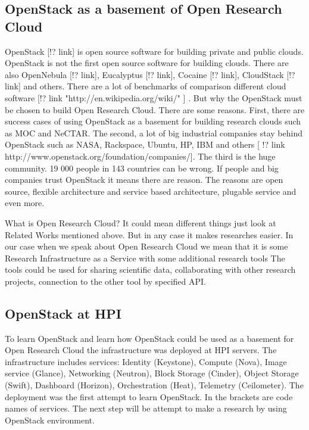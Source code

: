 \subsection{OpenStack as a basement of Open Research Cloud}
OpenStack [!? link] is open source software for building private and public clouds. OpenStack is not the first open source software for building clouds. There are also OpenNebula [!? link], Eucalyptus [!? link], Cocaine [!? link], CloudStack [!? link] and others. There are a lot of benchmarks of comparison different cloud software [!? link "http://en.wikipedia.org/wiki/" ] . But why the OpenStack must be chosen to build Open Research Cloud. There are some reasons. First, there are success cases of using OpenStack as a basement for building research clouds such as MOC and NeCTAR. The second, a lot of big industrial companies stay behind OpenStack such as NASA, Rackspace, Ubuntu, HP, IBM and others [ !? link http://www.openstack.org/foundation/companies/]. The third is the huge community. 19 000 people in 143 countries can be wrong. If people and big companies trust OpenStack it means there are reason. The reasons are open source, flexible architecture and service based architecture, plugable service and even more.  

What is Open Research Cloud? It could mean different things just look at Related Works mentioned above. But in any case it makes researches easier. In our case when we speak about Open Research Cloud we mean that it is some Research Infrastructure as a Service with some additional research tools The tools could be used for sharing scientific data, collaborating with other research projects, connection to the other tool by specified API. 



\subsection{OpenStack at HPI}
To learn OpenStack and learn how OpenStack could be used as a basement for Open Research Cloud the infrastructure was deployed at HPI servers. The infrastructure includes services: Identity (Keystone), Compute (Nova), Image service (Glance), Networking (Neutron), Block Storage (Cinder), Object Storage (Swift), Dashboard (Horizon), Orchestration (Heat), Telemetry (Ceilometer). The deployment was the first attempt to learn OpenStack. In the brackets are code names of services. The next step will be attempt to make a research by using OpenStack environment. 






% 